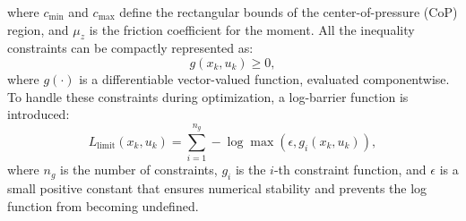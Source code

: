 \documentclass[main.tex]{subfiles}
\begin{document}
where $c_{\text{min}}$ and $c_{\text{max}}$ define the rectangular bounds of the center-of-pressure (CoP) region, and $\mu_z$ is the friction coefficient for the moment.
All the inequality constraints can be compactly represented as:
\begin{equation}
g(x_k, u_k) \geq 0,
\end{equation}
where $g(\cdot)$ is a differentiable vector-valued function, evaluated componentwise.
To handle these constraints during optimization, a log-barrier function is introduced:
\begin{equation}
L_{\text{limit}}(x_k, u_k) = \sum_{i=1}^{n_g} -\log \max(\epsilon, g_i(x_k, u_k)),
\end{equation}
where $n_g$ is the number of constraints, $g_i$ is the $i$-th constraint function, and $\epsilon$ is a small positive constant that ensures numerical stability and prevents the log function from becoming undefined.
\end{document}
